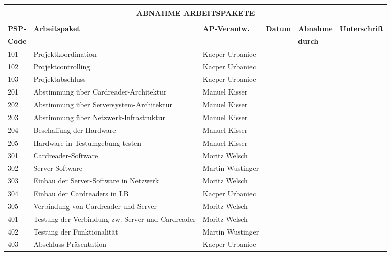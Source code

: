 \begingroup
\begin{small}
\renewcommand*{\arraystretch}{1.1} %
\begin{center}
\begin{tabularx}{\textwidth}{|l|p{3.5cm}|X|l|l|l|}
    \hline
    \multicolumn{6}{|c|}{\vspace{-0.05} \rowcolor{gray}} \\
    \multicolumn{6}{|c|}{\rowcolor{gray} \bfseries \normalsize \color{white} ABNAHME ARBEITSPAKETE \vspace{-0.5}} \\
    \multicolumn{6}{|c|}{\rowcolor{gray}} \\
    \hline
    \normalsize \textbf{PSP-} & \normalsize \textbf{Arbeitspaket} & \normalsize \textbf{AP-Verantw.} & \normalsize \textbf{Datum} & \normalsize \textbf{Abnahme} & \normalsize \textbf{Unterschrift} \\
    \normalsize \textbf{Code} & & &  & \normalsize \textbf{durch}& \\
    \hline
    101& Projektkoordination &Kacper Urbaniec&&&\\
    \hline
    102& Projektcontrolling &Kacper Urbaniec&&&\\
    \hline
    103& Projektabschluss &Kacper Urbaniec&&&\\
    \hline
    201& Abstimmung über Cardreader-Architektur &Manuel Kisser&&&\\
    \hline
    202& Abstimmung über Serversystem-Architektur &Manuel Kisser&&&\\
    \hline
    203& Abstimmung über Netzwerk-Infrastruktur &Manuel Kisser&&&\\
    \hline
    204& Beschaffung der Hardware &Manuel Kisser&&&\\
    \hline
    205& Hardware in Testumgebung testen &Manuel Kisser&&&\\
    \hline
    301& Cardreader-Software &Moritz Welsch&&&\\
    \hline
    302& Server-Software &Martin Wustinger&&&\\
    \hline
    303& Einbau der Server-Software in Netzwerk &Moritz Welsch&&&\\
    \hline
    304& Einbau der Cardreaders in LB &Kacper Urbaniec&&&\\
    \hline
    305& Verbindung von Cardreader und Server &Moritz Welsch&&&\\
    \hline
    401& Testung der Verbindung zw. Server und Cardreader &Moritz Welsch&&&\\
    \hline
    402& Testung der Funktionalität &Martin Wustinger&&&\\
    \hline
    403& Abschluss-Präsentation &Kacper Urbaniec&&&\\
    \hline

\end{tabularx}
\end{center}
\end{small}
\endgroup


